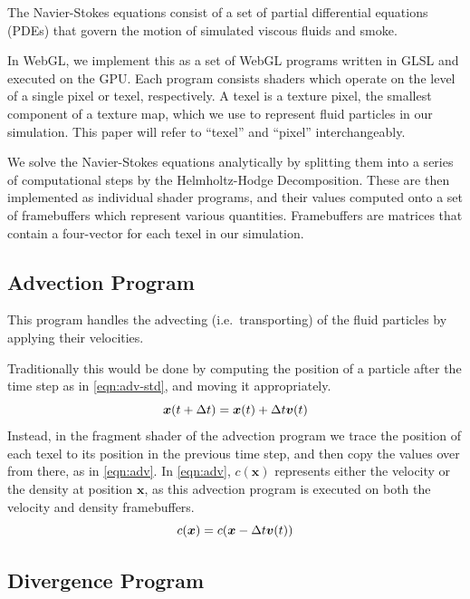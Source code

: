 The Navier-Stokes equations consist of a set of partial differential equations (PDEs) that 
govern the motion of simulated viscous fluids and smoke. \cite{fluid}

In WebGL, we implement this as a set of WebGL programs written in GLSL and executed on the GPU. 
Each program consists shaders which
operate on the level of a single pixel or texel, respectively.
A texel is a texture pixel, the smallest component of a texture map,
which we use to represent fluid particles in our simulation.
This paper will refer to ``texel'' and ``pixel'' interchangeably.

We solve the Navier-Stokes equations analytically by splitting them into a series 
of computational steps by the Helmholtz-Hodge Decomposition. 
These are then implemented as individual shader programs,
and their values computed onto a set of framebuffers which represent various quantities.
Framebuffers are matrices that contain a four-vector for each texel in our simulation. 

\subsection{Advection Program}

This program handles the advecting (i.e.\ transporting) of the fluid particles
by applying their velocities.

Traditionally this would be done by computing the position of a particle after 
the time step as in \autoref{eqn:adv-std}, and moving it appropriately.
\begin{equation}\label{eqn:adv-std}
  \bm{x}(t+\Delta t)=\bm{x}(t) + \Delta t \bm{v}(t)
\end{equation}
Instead, in the fragment shader of the advection program we trace the position of each texel to its 
position in the previous time step, and then copy the values over from there, as in \autoref{eqn:adv}.
In \autoref{eqn:adv}, $c(\bm{x})$ represents either the velocity or the density at position $\bm{x}$,
as this advection program is executed on both the velocity and density framebuffers.
\begin{equation}\label{eqn:adv}
  c(\bm{x}) = c(\bm{x} - \Delta t \bm{v}(t))
\end{equation}

\subsection{Divergence Program}


